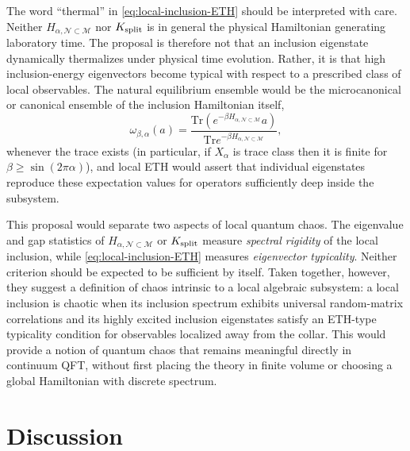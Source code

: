 \documentclass[a4paper,11pt]{article}
\theoremstyle{definition}
\newcommand{\Tr}{\text{Tr}}
\newcommand{\mN}{\mathcal{N}}
\newcommand{\mM}{\mathcal{M}}
\begin{document}
The word ``thermal'' in \eqref{eq:local-inclusion-ETH} should be interpreted with care.  Neither $H_{\alpha,\mN\subset\mM}$ nor $K_{\rm split}$ is in general the physical Hamiltonian generating laboratory time.  The proposal is therefore not that an inclusion eigenstate dynamically thermalizes under physical time evolution.  Rather, it is that high inclusion-energy eigenvectors become typical with respect to a prescribed class of local observables.  The natural equilibrium ensemble would be the microcanonical or canonical ensemble of the inclusion Hamiltonian itself,
\begin{equation}
    \omega_{\beta,\alpha}(a)
    =
    \frac{
    \Tr\!\left(e^{-\beta H_{\alpha,\mN\subset\mM}}a\right)
    }{
    \Tr e^{-\beta H_{\alpha,\mN\subset\mM}}
    },
    \label{eq:local-inclusion-canonical}
\end{equation}
whenever the trace exists (in particular, if $X_\alpha$ is trace class then it is finite for $\beta\geq\sin(2\pi\alpha)$), and local ETH would assert that individual eigenstates reproduce these expectation values for operators sufficiently deep inside the subsystem.

This proposal would separate two aspects of local quantum chaos.  The eigenvalue and gap statistics of $H_{\alpha,\mN\subset\mM}$ or $K_{\rm split}$ measure \emph{spectral rigidity} of the local inclusion, while \eqref{eq:local-inclusion-ETH} measures \emph{eigenvector typicality}.  Neither criterion should be expected to be sufficient by itself.  Taken together, however, they suggest a definition of chaos intrinsic to a local algebraic subsystem: a local inclusion is chaotic when its inclusion spectrum exhibits universal random-matrix correlations and its highly excited inclusion eigenstates satisfy an ETH-type typicality condition for observables localized away from the collar.  This would provide a notion of quantum chaos that remains meaningful directly in continuum QFT, without first placing the theory in finite volume or choosing a global Hamiltonian with discrete spectrum.

\section{Discussion}\label{sec:discussion}
\end{document}
